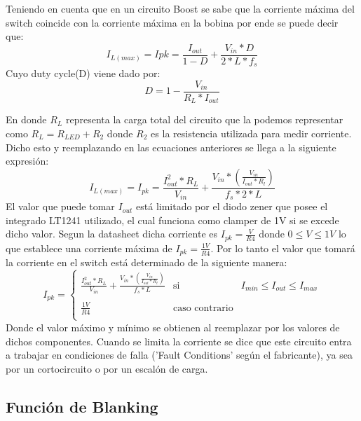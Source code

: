 \documentclass[e4_tp2_main.tex]{subfiles}
\begin{document}
Teniendo en cuenta que en un circuito Boost se sabe que la corriente máxima del switch coincide con la corriente máxima en la bobina por ende se puede decir que:
\begin{equation}
I_{L(max)}=I{pk}=\frac{I_{out}}{1-D}+\frac{V_{in}*D}{2*L*f_s}
\end{equation}
Cuyo duty cycle(D) viene dado por:
\begin{equation}
D=1-\frac{V_{in}}{R_L*I_{out}}
\end{equation} 

En donde $R_L$ representa la carga total del circuito que la podemos representar como $R_L=R_{LED}+R_2$ donde $R_2$ es la resistencia utilizada para medir corriente. Dicho esto y reemplazando en las ecuaciones anteriores se llega a la siguiente expresión:
\begin{equation}
I_{L(max)}=I_{pk}=\frac{I_{out}^2*R_L}{V_{in}}+\frac{V_{in}*\left(\frac{V_{in}}{I_{out}*R_l}\right)}{f_s*2*L}
\end{equation}
El valor que puede tomar $I_{out}$ está limitado por el diodo zener que posee el integrado LT1241 utilizado, el cual funciona como clamper de 1V si se excede dicho valor. Segun la datasheet dicha corriente es $I_{pk}=\frac{V}{R4} $ donde  $ 0 \leq V \leq 1V$ lo que establece una corriente máxima de $I_{pk}=\frac{1V}{R4}$. Por lo tanto el valor que tomará la corriente en el switch está determinado de la siguiente manera:
\[
I_{pk}= \left\{ \begin{array}{lcc}
             \frac{I_{out}^2*R_L}{V_{in}}+\frac{V_{in}*\left(\frac{V_{in}}{I_{out}*R_l}\right)}{f_s*L} &   \textrm{si}  & I_{min}\leq I_{out} \leq I_{max}  \\
             \\ \frac{1V}{R4} &  \textrm{caso contrario} \\
             \end{array}
   \right.
\]   
Donde el valor máximo y mínimo se obtienen al reemplazar por los valores de dichos componentes. Cuando se limita la corriente se dice que este circuito entra a trabajar en condiciones de falla ('Fault Conditions' según el fabricante), ya sea por un cortocircuito o por un escalón de carga.


\subsection{Función de Blanking}
\end{document}

